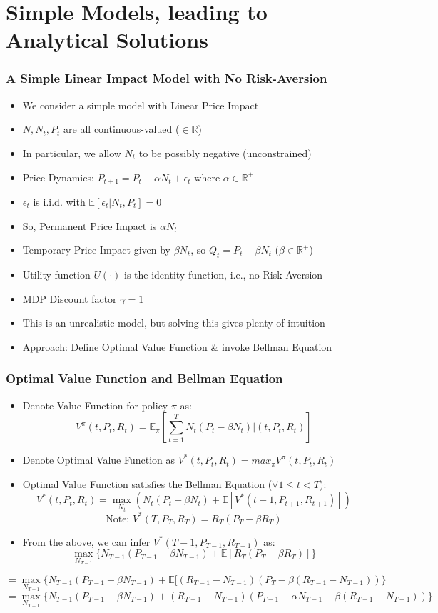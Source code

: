 \documentclass[handout]{beamer}
\begin{document}
\section{Simple Models, leading to Analytical Solutions}

\begin{frame}
\frametitle{A Simple Linear Impact Model with No Risk-Aversion}
\pause
\begin{itemize}[<+->]
\item We consider a simple model with Linear Price Impact
\item $N, N_t, P_t$ are all continuous-valued ($\in \mathbb{R}$)
\item In particular, we allow $N_t$ to be possibly negative (unconstrained)
\item Price Dynamics: $P_{t+1} = P_t - \alpha N_t + \epsilon_t$ where $\alpha \in \mathbb{R}^+$
\item $\epsilon_t$ is i.i.d. with $\mathbb{E}[\epsilon_t|N_t, P_t] = 0$
\item So, Permanent Price Impact is $\alpha N_t$
\item Temporary Price Impact given by $\beta N_t$, so $Q_t = P_t - \beta N_t$ ($\beta \in \mathbb{R}^+$)
\item Utility function $U(\cdot)$ is the identity function, i.e., no Risk-Aversion
\item MDP Discount factor $\gamma = 1$
\item This is an unrealistic model, but solving this gives plenty of intuition
\item Approach: Define Optimal Value Function \& invoke Bellman Equation
\end{itemize}
\end{frame}

\begin{frame}
\frametitle{Optimal Value Function and Bellman Equation}
\pause
\begin{itemize}[<+->]
\item Denote Value Function for policy $\pi$ as: $$V^{\pi}(t, P_t, R_t) = \mathbb{E}_{\pi}[\sum_{t=1}^T N_t (P_t - \beta N_t)|(t,P_t,R_t)]$$
\item Denote Optimal Value Function as $V^*(t,P_t,R_t) = max_{\pi} V^{\pi}(t,P_t,R_t)$
\item Optimal Value Function satisfies the Bellman Equation ($\forall 1 \leq t < T$):
$$V^*(t,P_t,R_t) = \max_{N_t} (N_t(P_t - \beta N_t)  + \mathbb{E}[V^*(t+1, P_{t+1}, R_{t+1})])$$
$$\mbox{Note: } V^*(T, P_T,R_T) = R_T(P_T - \beta R_T)$$
\item From the above, we can infer $V^*(T-1,P_{T-1},R_{T-1})$ as:
$$\max_{N_{T-1}} \{ N_{T-1}(P_{T-1} - \beta N_{T-1})  + \mathbb{E}[R_T(P_T - \beta R_T)] \}$$
\end{itemize}
$$=\max_{N_{T-1}} \{ N_{T-1}(P_{T-1} - \beta N_{T-1})  + \mathbb{E}[(R_{T-1} - N_{T-1})(P_T - \beta(R_{T-1} - N_{T-1})) \}$$
$$=\max_{N_{T-1}} \{ N_{T-1}(P_{T-1} - \beta N_{T-1})  + (R_{T-1} - N_{T-1})(P_{T-1} - \alpha N_{T-1} - \beta(R_{T-1} - N_{T-1})) \}$$
\end{frame}
\end{document}
